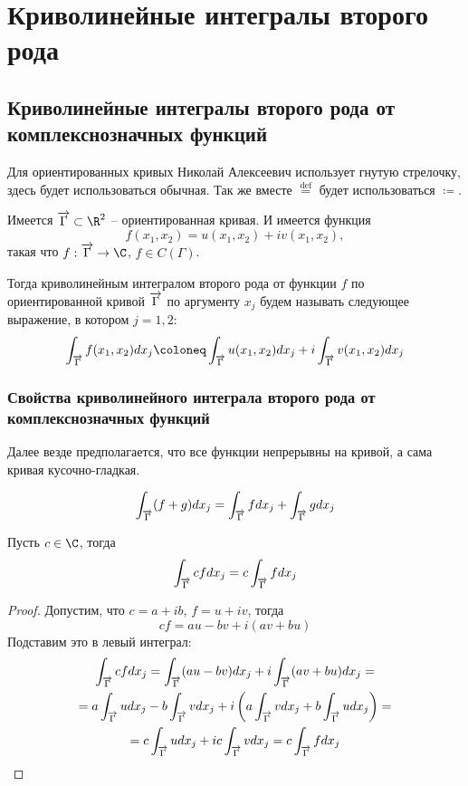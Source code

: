 \documentclass[main]{subfiles}
\begin{document}
\chapter{Криволинейные интегралы второго рода}
\section{Криволинейные интегралы второго рода от комплекснозначных функций} 
Для ориентированных кривых Николай Алексеевич использует гнутую стрелочку, здесь будет использоваться обычная.
Так же вместе $\stackrel{\text{def}}{=}$ будет использоваться $\coloneq$.
\begin{definition}
    Имеется $\AnClOrCurve \subset \R^2$ -- ориентированная кривая.
    И имеется функция \[f(x_1, x_2) = u(x_1, x_2) + i v(x_1, x_2),\] такая что $f: \AnClOrCurve \to \C$, $f \in C(\Gamma)$.

    Тогда криволинейным интегралом второго рода от функции $f$ по ориентированной кривой $\AnClOrCurve$ по аргументу $x_j$ будем называть следующее выражение, в котором $j=1,2$:
    \[\AnClOrInt f(x_1, x_2) dx_j \coloneq \AnClOrInt u(x_1, x_2) dx_j + i \AnClOrInt v(x_1, x_2) dx_j\]
\end{definition}

\subsection{Свойства криволинейного интеграла второго рода от комплекснозначных функций}
Далее везде предполагается, что все функции непрерывны на кривой, а сама кривая кусочно-гладкая.

\begin{property}
    \[\AnClOrInt (f+g) dx_j = \AnClOrInt f dx_j + \AnClOrInt g dx_j\]
\end{property}

\begin{property}
    Пусть $c \in \C$, тогда
    \[\AnClOrInt c f dx_j = c \AnClOrInt f dx_j\]
\end{property}
\begin{proof}
    Допустим, что $c = a + ib$, $f = u + iv$, тогда
    \[cf = au - bv + i(av + bu)\]
    Подставим это в левый интеграл:
    \begin{multline*}
        \AnClOrInt c f dx_j = \AnClOrInt (au - bv) dx_j + i \AnClOrInt (av + bu) dx_j =\\
        = a \AnClOrInt u dx_j - b \AnClOrInt v dx_j + i\left(a \AnClOrInt v dx_j + b \AnClOrInt u dx_j\right) = \\
        = c \AnClOrInt u dx_j + i c \AnClOrInt v dx_j = c \AnClOrInt f dx_j
    \end{multline*}
\end{proof}
\end{document}
